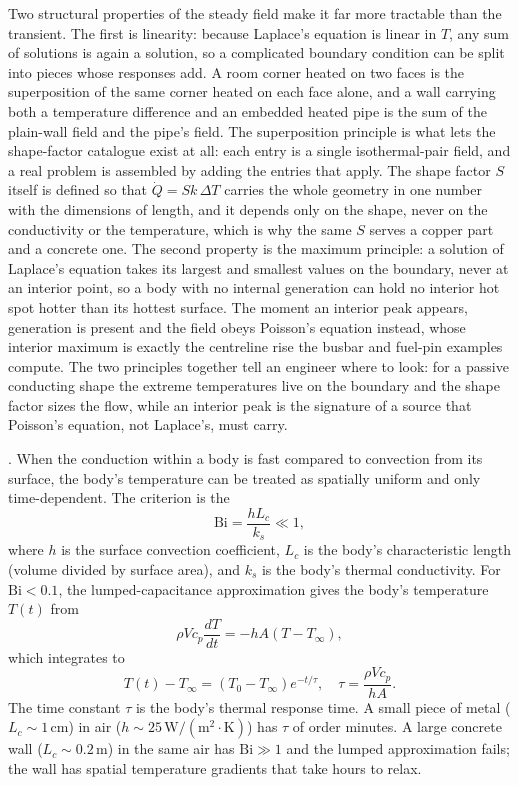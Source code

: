 Two structural properties of the steady field make it far more tractable
than the transient. The first is linearity: because Laplace's equation is
linear in $T$, any sum of solutions is again a solution, so a complicated
boundary condition can be split into pieces whose responses add. A room
corner heated on two faces is the superposition of the same corner heated on
each face alone, and a wall carrying both a temperature difference and an
embedded heated pipe is the sum of the plain-wall field and the pipe's field.
The superposition principle is what lets the shape-factor catalogue exist at
all: each entry is a single isothermal-pair field, and a real problem is
assembled by adding the entries that apply. The shape factor $S$ itself is
defined so that $\dot{Q} = S k\,\Delta T$ carries the whole geometry in one
number with the dimensions of length, and it depends only on the shape, never
on the conductivity or the temperature, which is why the same $S$ serves a
copper part and a concrete one. The second property is the maximum principle:
a solution of Laplace's equation takes its largest and smallest values on the
boundary, never at an interior point, so a body with no internal generation
can hold no interior hot spot hotter than its hottest surface. The moment an
interior peak appears, generation is present and the field obeys Poisson's
equation instead, whose interior maximum is exactly the centreline rise the
busbar and fuel-pin examples compute. The two principles together tell an
engineer where to look: for a passive conducting shape the extreme
temperatures live on the boundary and the shape factor sizes the flow, while
an interior peak is the signature of a source that Poisson's equation, not
Laplace's, must carry.

. When the
conduction within a body is fast compared to convection from its
surface, the body's temperature can be treated as spatially uniform
and only time-dependent. The criterion is the 
\[
\text{Bi} = \frac{h L_c}{k_s} \ll 1,
\]
where $h$ is the surface convection coefficient, $L_c$ is the body's
characteristic length (volume divided by surface area), and $k_s$
is the body's thermal conductivity. For $\text{Bi} < 0.1$, the
lumped-capacitance approximation gives the body's temperature
$T(t)$ from
\[
\rho V c_p \frac{dT}{dt} = -h A (T - T_\infty),
\]
which integrates to
\[
T(t) - T_\infty = (T_0 - T_\infty) e^{-t/\tau}, \quad \tau =
\frac{\rho V c_p}{h A}.
\]
The time constant $\tau$ is the body's thermal response time. A
small piece of metal ($L_c \sim 1\,\si{\centi\meter}$) in air ($h
\sim 25\,\text{W}/(\text{m}^2\cdot\si{\kelvin})$) has $\tau$ of
order minutes. A large concrete wall ($L_c \sim 0.2\,\text{m}$) in
the same air has $\text{Bi} \gg 1$ and the lumped approximation
fails; the wall has spatial temperature gradients that take hours
to relax.


